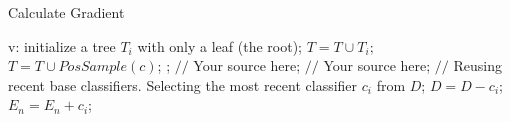 \documentclass[11pt]{article}
\begin{document}
\begin{CJK*}{UTF8}{gkai}
\begin{algorithm}[h]
    \caption{Calculate Gradient}
    \begin{algorithmic}[1]
        \Require
            v: 
        \State initialize a tree $T_{i}$ with only a leaf (the root);
        \State $T=T\cup T_{i};$
      \EndFor
        \label{code:TrainBase:getc}
        \State $T=T\cup PosSample(c)$;
        \label{code:TrainBase:pos}
      \EndFor;
        \State $//$ Your source here;
      \EndFor
        \State $//$ Your source here;
      \EndFor
      \State $//$ Reusing recent base classifiers.
      \label{code:recentStart}
        \State Selecting the most recent classifier $c_i$ from $D$;
        \State $D=D-c_i$;
        \State $E_n=E_n+c_i$;
      \EndWhile
      \label{code:recentEnd}
    \end{algorithmic}
\end{algorithm}
\end{CJK*}
\end{document}
